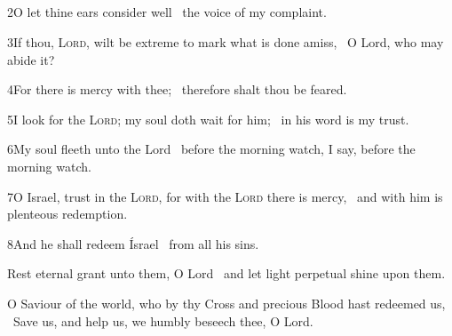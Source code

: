 \subsection[{Psalm 130}]{}


2\enspace O let thine ears consider well \star\ the voice of my complaint.

3\enspace If thou, {\scshape Lord}, wilt be extreme to mark what is done amiss, \star\ O Lord, who may abide it?

4\enspace For there is mercy with thee; \star\ therefore shalt thou be feared.

5\enspace I look for the {\scshape Lord}; my soul doth wait for him; \star\ in his word is my trust.

6\enspace My soul fleeth unto the Lord \star\ before the morning watch, I say, before the morning watch.

7\enspace O Israel, trust in the {\scshape Lord}, for with the {\scshape Lord} there is mercy, \star\ and with him is plenteous redemption.

8\enspace And he shall redeem Ísrael \star\ from all his sins.

Rest eternal grant unto them, O Lord \star\ and let light perpetual shine upon them.

\medskip
{} O Saviour of the world, who by thy Cross and precious Blood hast redeemed us, \star\ Save us, and help us, we humbly beseech thee, O Lord.


